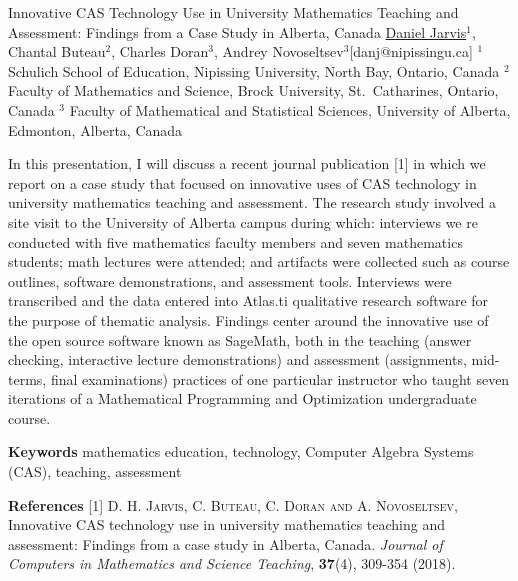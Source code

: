 


\begin{abstract_online}{Innovative CAS Technology Use in University Mathematics
Teaching and Assessment: Findings from a Case Study in Alberta, Canada}{%
        \underline{Daniel Jarvis}$^{1}$, Chantal Buteau$^{2}$,
        Charles Doran$^{3}$, Andrey Novoseltsev$^{3}$}{[danj@nipissingu.ca]
        }{%
        $^1$ Schulich School of Education, Nipissing University, North Bay,
Ontario, Canada \newline{}%
        $^2$ Faculty of Mathematics and Science, Brock University, St.\
Catharines, Ontario, Canada \newline{}%
        $^3$ Faculty of Mathematical and Statistical Sciences, University of
Alberta, Edmonton, Alberta, Canada}

In this presentation, I will discuss a recent journal publication [1]
in which we report on a case study that focused on innovative uses of
CAS technology in university mathematics teaching and assessment. The
research study involved a site visit to the University of Alberta
campus during which: interviews we re conducted with five mathematics
faculty members and seven mathematics students; math lectures were
attended; and artifacts were collected such as course outlines, software
demonstrations, and assessment tools. Interviews were transcribed and
the data entered into Atlas.ti qualitative research software for the
purpose of thematic analysis. Findings center around the innovative use
of the open source software known as SageMath, both in the teaching
(answer checking, interactive lecture demonstrations) and assessment
(assignments, mid-terms, final examinations) practices of one particular
instructor who taught seven iterations of a Mathematical Programming
and Optimization undergraduate course.

\textbf{Keywords} \newline{} mathematics education, technology,
Computer Algebra Systems (CAS), teaching, assessment

\textbf{References} \newline{}
[1] \textsc{D. H. Jarvis, C. Buteau, C. Doran and A. Novoseltsev},
Innovative CAS technology use in university mathematics teaching and
assessment: Findings from a case study in Alberta, Canada.
\emph{Journal of Computers in Mathematics and Science Teaching},
\textbf{37}(4), 309-354 (2018). 


\end{abstract_online}
